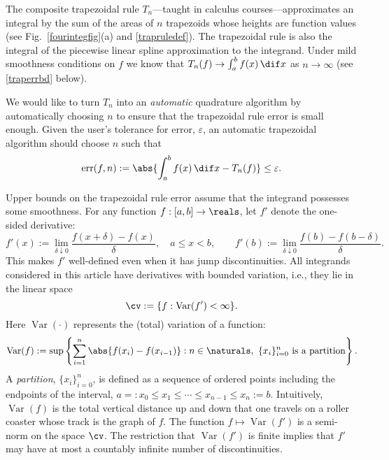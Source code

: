 \documentclass[]{article}
\DeclareMathOperator{\Var}{Var}
\DeclareMathOperator{\err}{err}
\theoremstyle{definition}
\theoremstyle{remark}
\newcommand{\datasites}{\{x_i\}_{i=0}^n}
\begin{document}
The composite trapezoidal rule $T_n$---taught in calculus courses---approximates an integral by the sum of the areas of $n$ trapezoids whose heights are function values (see Fig.\ \ref{fourintegfig}(a) and \eqref{trapruledef}). The trapezoidal rule is also the integral of the piecewise linear spline approximation to the integrand. Under mild smoothness conditions on $f$ we know that $T_n(f) \to \int_a^b f(x) \, \dif x$ as $n \to \infty$ (see \eqref{traperrbd} below). 

We would like to turn $T_n$ into an \emph{automatic} quadrature algorithm by automatically choosing $n$ to ensure that the trapezoidal rule error is small enough.  Given the user's tolerance for error, $\varepsilon$, an automatic trapezoidal algorithm should choose $n$ such that 
\begin{equation} \label{errdef}
\err(f,n) := \abs{\int_a^b f(x) \, \dif x - T_n(f)} \le \varepsilon.
\end{equation}

Upper bounds on the trapezoidal rule error assume that the integrand possesses some smoothness.  For any function $f:[a,b]\to \reals$, let $f'$ denote the one-sided derivative:
\[
f'(x):=\lim_{\delta \downarrow 0} \frac{f(x+\delta)-f(x)}{\delta}, \quad a \le x < b, \qquad f'(b):=\lim_{\delta \downarrow 0} \frac{f(b)-f(b-\delta)}{\delta}.
\]
This makes $f'$ well-defined even when it has jump discontinuities.  All integrands considered in this article have derivatives with bounded variation, i.e., they lie in the linear space
\[
\cv:=\{f : \Var(f')<\infty \}.
\]
Here $\Var(\cdot)$ represents the (total) variation of a function:
\begin{equation} \label{vardef}
\Var(f) \\
:= \sup \left \{ \sum_{i=1}^n \abs{f(x_i)-f(x_{i-1})} : n \in \naturals, \ \datasites \text{ is a partition} \right\}.
\end{equation}
A \emph{partition}, $\datasites$, is defined as a sequence of ordered points including the endpoints of the interval,  $a=:x_0 \le x_1 \le \cdots \le x_{n-1} \le x_{n}:=b$.  Intuitively, $\Var(f)$ is the total vertical distance up and down that one travels on a roller coaster whose track is the graph of $f$. The function $f \mapsto \Var(f')$ is a semi-norm on the space $\cv$. The restriction that $\Var(f')$ is finite implies that $f'$ may have at most a countably infinite number of discontinuities.
\end{document}
